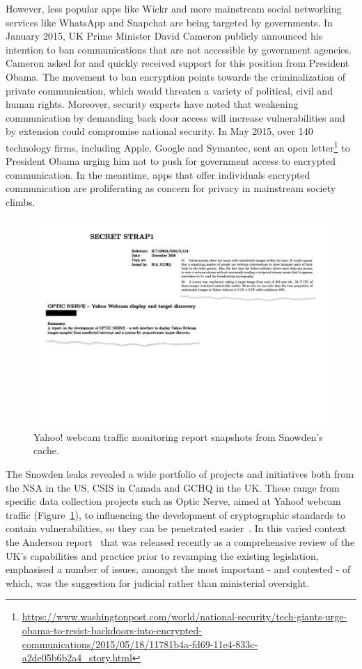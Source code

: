 \documentclass{llncs}
\begin{document}
However, less popular apps like Wickr and more mainstream social networking services like WhatsApp and Snapchat are being targeted by governments. In January 2015, UK Prime Minister David Cameron publicly announced his intention to ban communications that are not accessible by government agencies. Cameron asked for and quickly received support for this position from President Obama. The movement to ban encryption points towards the criminalization of private communication, which would threaten a variety of political, civil and human rights. Moreover, security experts have noted that weakening communication by demanding back door access will increase vulnerabilities and by extension could compromise national security. In May 2015, over 140 technology firms, including Apple, Google and Symantec, sent an open letter\footnote{\url{https://www.washingtonpost.com/world/national-security/tech-giants-urge-obama-to-resist-backdoors-into-encrypted-communications/2015/05/18/11781b4a-fd69-11e4-833c-a2de05b6b2a4_story.html}} to President Obama urging him not to push for government access to encrypted communication. In the meantime, apps that offer individuals encrypted communication are proliferating as concern for privacy in mainstream society climbs.

\begin{figure}
\begin{center}
\includegraphics[width=\textwidth]{images/fig1}
\caption{Yahoo! webcam traffic monitoring report snapshots from Snowden's cache.}
\label{fig:Yahoo}
\end{center}
\end{figure}

The Snowden leaks revealed a wide portfolio of projects and initiatives both from the NSA in the US, CSIS in Canada and GCHQ in the UK. These range from specific data collection projects such as Optic Nerve, aimed at Yahoo! webcam traffic (Figure~\ref{fig:Yahoo}), to influencing the development of cryptographic standards to contain vulnerabilities, so they can be penetrated easier~\cite{ECDH}. In this varied context the Anderson report~\cite{Anderson} that was released recently as a comprehensive review of the UK's capabilities and practice prior to revamping the existing legislation, emphasised a number of issues, amongst the most important - and contested - of which, was the suggestion for judicial rather than ministerial oversight.
\end{document}

